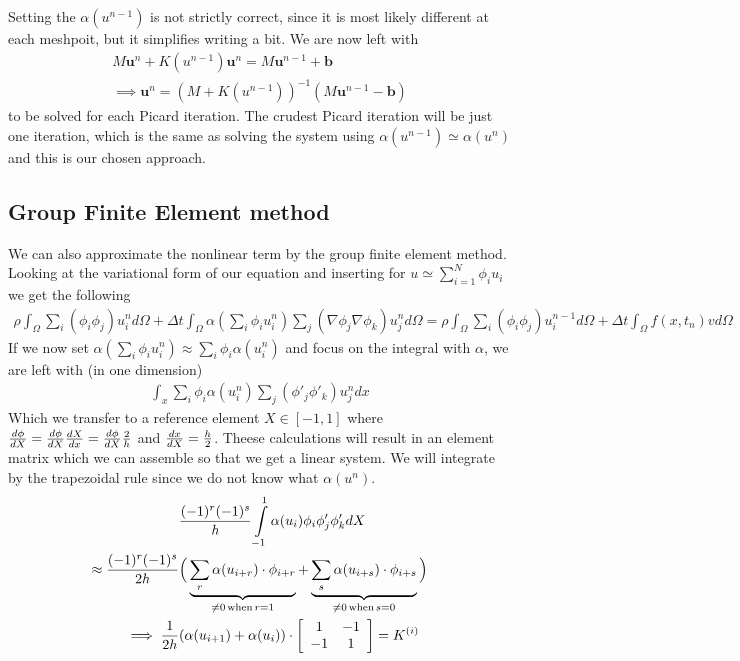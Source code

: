 \documentclass[a4paper,english, 10pt, twoside]{article}
\begin{document}
Setting the $\alpha(u^{n-1})$ is not strictly correct, since it is most likely different at each meshpoit, but it simplifies writing a bit. 
We are now left with
\begin{align*}
M\mathbf{u}^n + K(u^{n-1})\mathbf{u}^n = M\mathbf{u}^{n-1} + \mathbf{b}\\
\implies \mathbf{u}^n = (M+K(u^{n-1}))^{-1}(M\mathbf{u}^{n-1} -\mathbf{b})
\end{align*}
to be solved for each Picard iteration. The crudest Picard iteration will be just one iteration, which is the same as solving the system using
$\alpha(u^{n-1})\simeq\alpha(u^n)$ and this is our chosen approach.
\subsection{Group Finite Element method}
We can also approximate the nonlinear term by the group finite element method. Looking at the variational form of our equation and inserting 
for $u\simeq \sum\limits_{i=1}^N\phi_iu_i$ we get the following
\begin{align*}
\rho\int_\Omega \sum\limits_i(\phi_i\phi_j)u_i^nd\Omega+\Delta t\int_\Omega \alpha(\sum\limits_i\phi_iu_i^{n})\sum\limits_j(\nabla\phi_j\nabla 
\phi_k)u_j^nd\Omega = \rho\int_\Omega \sum\limits_i(\phi_i\phi_j)u_i^{n-1}d\Omega +\Delta t\int_\Omega f(x,t_n)vd\Omega
\end{align*}
If we now set $\alpha(\sum\limits_i\phi_iu_i^{n})\approx \sum\limits_i\phi_i\alpha(u_i^{n})$ and focus on the integral with $\alpha$, we are left with
(in one dimension)
\begin{align*}
 \int_x \sum\limits_i\phi_i\alpha(u_i^{n})\sum\limits_j(\phi'_j\phi'_k)u_j^ndx
\end{align*}
Which we transfer to a reference element $X\in[-1,1]$ where ${d \phi \over d X} = {d\phi \over dX}{dX \over dx} = {d\phi \over dX}{2\over h}$ 
and ${dx\over dX}={h\over 2}$. Theese calculations will result in an element matrix which we can assemble so that we get a linear system. We will 
integrate by the trapezoidal rule since we do not know what $\alpha(u^{n})$.
\begin{align*}
 &{(-1)^r(-1)^s\over h}\int\limits_{-1}^1\alpha(u_i)\phi_i\phi'_j\phi'_kdX \\
  \approx{(-1)^r(-1)^s \over 2h}& \Big(\underbrace{\sum\limits_r\alpha(u_{i+r})\cdot\phi_{i+r}}_{\neq0 \,\text{when} \, r=1} +
 \underbrace{\sum\limits_s\alpha(u_{i+s})\cdot\phi_{i+s}}_{\neq0 \,\text{when}\, s=0}\Big) \\
 \implies {1\over 2h}& (\alpha(u_{i+1})+\alpha(u_i))\cdot\left[\begin{array}{c c}
                                                        1&-1\\
                                                        -1&1
                                                       \end{array} \right] =K^{(i)}
\end{align*}
\end{document}
